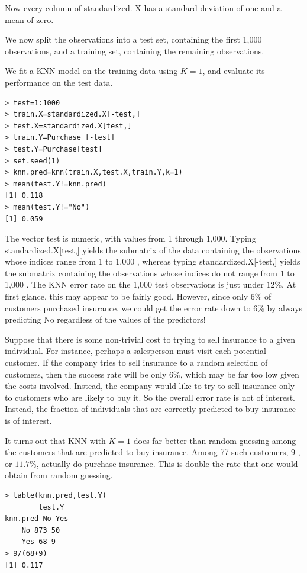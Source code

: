 \documentclass[10pt]{article}
\begin{document}
Now every column of standardized. X has a standard deviation of one and a mean of zero.

We now split the observations into a test set, containing the first 1,000 observations, and a training set, containing the remaining observations.

We fit a KNN model on the training data using $K=1$, and evaluate its performance on the test data.

\begin{verbatim}
> test=1:1000
> train.X=standardized.X[-test,]
> test.X=standardized.X[test,]
> train.Y=Purchase [-test]
> test.Y=Purchase[test]
> set.seed(1)
> knn.pred=knn(train.X,test.X,train.Y,k=1)
> mean(test.Y!=knn.pred)
[1] 0.118
> mean(test.Y!="No")
[1] 0.059
\end{verbatim}

The vector test is numeric, with values from 1 through 1,000. Typing standardized.X[test,] yields the submatrix of the data containing the observations whose indices range from 1 to 1,000 , whereas typing standardized.X[-test,] yields the submatrix containing the observations whose indices do not range from 1 to 1,000 . The KNN error rate on the 1,000 test observations is just under $12 \%$. At first glance, this may appear to be fairly good. However, since only $6 \%$ of customers purchased insurance, we could get the error rate down to $6 \%$ by always predicting No regardless of the values of the predictors!

Suppose that there is some non-trivial cost to trying to sell insurance to a given individual. For instance, perhaps a salesperson must visit each potential customer. If the company tries to sell insurance to a random selection of customers, then the success rate will be only $6 \%$, which may be far too low given the costs involved. Instead, the company would like to try to sell insurance only to customers who are likely to buy it. So the overall error rate is not of interest. Instead, the fraction of individuals that are correctly predicted to buy insurance is of interest.

It turns out that KNN with $K=1$ does far better than random guessing among the customers that are predicted to buy insurance. Among 77 such customers, 9 , or $11.7 \%$, actually do purchase insurance. This is double the rate that one would obtain from random guessing.

\begin{verbatim}
> table(knn.pred,test.Y)
        test.Y
knn.pred No Yes
    No 873 50
    Yes 68 9
> 9/(68+9)
[1] 0.117
\end{verbatim}
\end{document}
